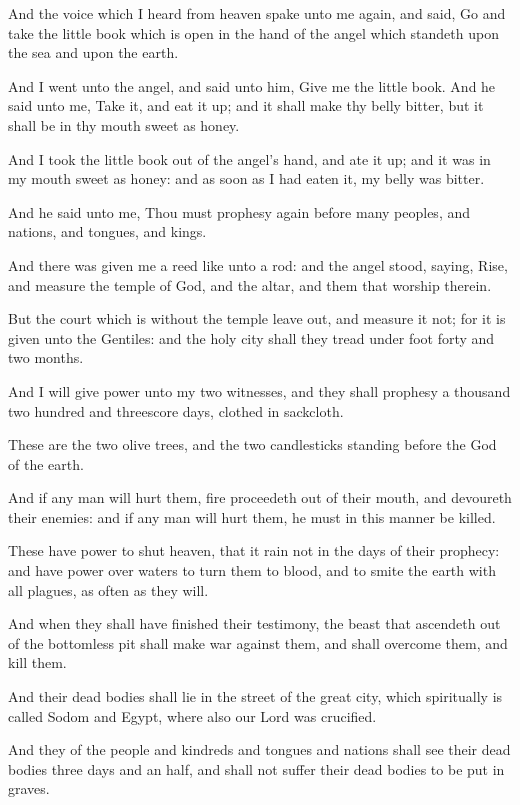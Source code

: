 \Verse And the voice which I heard from heaven spake unto me again, and said, Go and take the little book which is open in the hand of the angel which standeth upon the sea and upon the earth.

\Verse And I went unto the angel, and said unto him, Give me the little book. And he said unto me, Take it, and eat it up; and it shall make thy belly bitter, but it shall be in thy mouth sweet as honey.

\Verse And I took the little book out of the angel's hand, and ate it up; and it was in my mouth sweet as honey: and as soon as I had eaten it, my belly was bitter.

\Verse And he said unto me, Thou must prophesy again before many peoples, and nations, and tongues, and kings.

\Chapter
\Verse And there was given me a reed like unto a rod: and the angel stood, saying, Rise, and measure the temple of God, and the altar, and them that worship therein.

\Verse But the court which is without the temple leave out, and measure it not; for it is given unto the Gentiles: and the holy city shall they tread under foot forty and two months.

\Verse And I will give power unto my two witnesses, and they shall prophesy a thousand two hundred and threescore days, clothed in sackcloth.

\Verse These are the two olive trees, and the two candlesticks standing before the God of the earth.

\Verse And if any man will hurt them, fire proceedeth out of their mouth, and devoureth their enemies: and if any man will hurt them, he must in this manner be killed.

\Verse These have power to shut heaven, that it rain not in the days of their prophecy: and have power over waters to turn them to blood, and to smite the earth with all plagues, as often as they will.

\Verse And when they shall have finished their testimony, the beast that ascendeth out of the bottomless pit shall make war against them, and shall overcome them, and kill them.

\Verse And their dead bodies shall lie in the street of the great city, which spiritually is called Sodom and Egypt, where also our Lord was crucified.

\Verse And they of the people and kindreds and tongues and nations shall see their dead bodies three days and an half, and shall not suffer their dead bodies to be put in graves.

